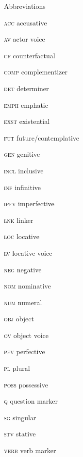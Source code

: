 \documentclass[output=paper]{langsci/langscibook}
\begin{document}
\begin{stylelsUnNumberedSection}
Abbreviations
\end{stylelsUnNumberedSection}

\textsc{acc}  accusative

\textsc{av}  actor voice

\textsc{cf}  counterfactual

\textsc{comp}  complementizer

\textsc{det}  determiner

\textsc{emph}  emphatic

\textsc{exst}  existential

\textsc{fut}  future/contemplative

\textsc{gen}  genitive

\textsc{incl}  inclusive

\textsc{inf}  infinitive

\textsc{ipfv}  imperfective

\textsc{lnk}  linker

\textsc{loc}  locative

\textsc{lv}  locative voice

\textsc{neg}  negative

\textsc{nom}  nominative

\textsc{num}  numeral

\textsc{obj}  object

\textsc{ov}  object voice

\textsc{pfv}  perfective

\textsc{pl}  plural

\textsc{poss}  possessive

\textsc{q}  question marker

\textsc{sg}  singular

\textsc{stv}  stative

\textsc{verb}  verb marker
\end{document}

